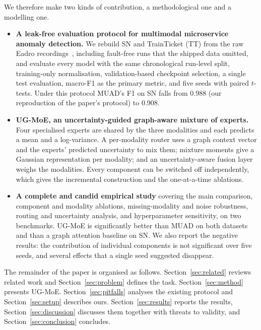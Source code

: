 \documentclass[journal]{IEEEtran}
\newcommand{\ugmoe}{UG-MoE}
\begin{document}
We therefore make two kinds of contribution, a methodological one and a modelling one.

\begin{itemize}
  \item \textbf{A leak-free evaluation protocol for multimodal microservice anomaly detection.} We rebuild
  SN and TrainTicket (TT) from the raw Eadro recordings~\cite{lee2023eadro}, including fault-free runs that
  the shipped data omitted, and evaluate every model with the same chronological run-level split,
  training-only normalisation, validation-based checkpoint selection, a single test evaluation, macro-F1 as
  the primary metric, and five seeds with paired $t$-tests. Under this protocol MUAD's F1 on SN falls from
  0.988 (our reproduction of the paper's protocol) to 0.908.
  \item \textbf{\ugmoe, an uncertainty-guided graph-aware mixture of experts.} Four specialised experts are
  shared by the three modalities and each predicts a mean and a log-variance. A per-modality router uses a
  graph context vector and the experts' predicted uncertainty to mix them; mixture moments give a Gaussian
  representation per modality; and an uncertainty-aware fusion layer weighs the modalities. Every
  component can be switched off independently, which gives the incremental construction and the
  one-at-a-time ablations.
  \item \textbf{A complete and candid empirical study} covering the main comparison, component and
  modality ablations, missing-modality and noise robustness, routing and uncertainty analysis, and
  hyperparameter sensitivity, on two benchmarks. \ugmoe{} is significantly better than MUAD on both
  datasets and than a graph attention baseline on SN. We also report the negative results: the
  contribution of individual components is not significant over five seeds, and several effects that a
  single seed suggested disappear.
\end{itemize}

The remainder of the paper is organised as follows. Section~\ref{sec:related} reviews related work and
Section~\ref{sec:problem} defines the task. Section~\ref{sec:method} presents \ugmoe. Section~\ref{sec:pitfalls}
analyses the existing protocol and Section~\ref{sec:setup} describes ours. Section~\ref{sec:results} reports the
results, Section~\ref{sec:discussion} discusses them together with threats to validity, and
Section~\ref{sec:conclusion} concludes.

\end{document}
